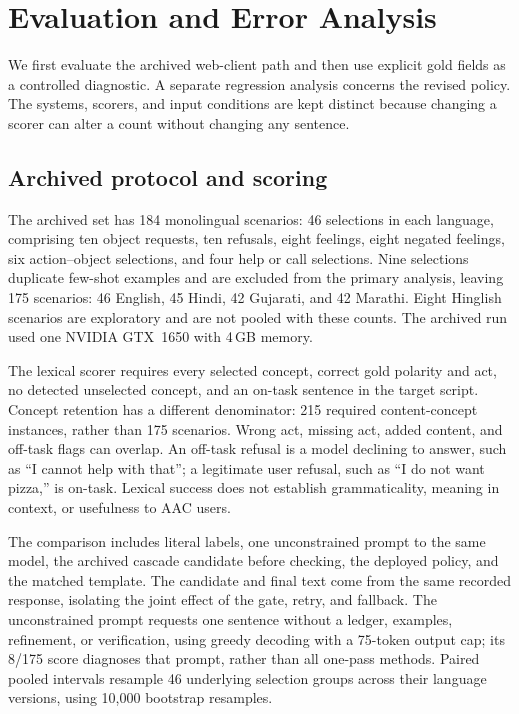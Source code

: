 \section{Evaluation and Error Analysis}
\label{sec:eval}
We first evaluate the archived web-client path and then use explicit gold fields as a controlled diagnostic.
A separate regression analysis concerns the revised policy.
The systems, scorers, and input conditions are kept distinct because changing a scorer can alter a count without changing any sentence.

\subsection{Archived protocol and scoring}
The archived set has 184 monolingual scenarios: 46 selections in each language, comprising ten object requests, ten refusals, eight feelings, eight negated feelings, six action--object selections, and four help or call selections.
Nine selections duplicate few-shot examples and are excluded from the primary analysis, leaving 175 scenarios: 46 English, 45 Hindi, 42 Gujarati, and 42 Marathi.
Eight Hinglish scenarios are exploratory and are not pooled with these counts.
The archived run used one NVIDIA GTX~1650 with 4\,GB memory.

The lexical scorer requires every selected concept, correct gold polarity and act, no detected unselected concept, and an on-task sentence in the target script.
Concept retention has a different denominator: 215 required content-concept instances, rather than 175 scenarios.
Wrong act, missing act, added content, and off-task flags can overlap.
An off-task refusal is a model declining to answer, such as “I cannot help with that”; a legitimate user refusal, such as “I do not want pizza,” is on-task.
Lexical success does not establish grammaticality, meaning in context, or usefulness to AAC users.

The comparison includes literal labels, one unconstrained prompt to the same model, the archived cascade candidate before checking, the deployed policy, and the matched template.
The candidate and final text come from the same recorded response, isolating the joint effect of the gate, retry, and fallback.
The unconstrained prompt requests one sentence without a ledger, examples, refinement, or verification, using greedy decoding with a 75-token output cap; its 8/175 score diagnoses that prompt, rather than all one-pass methods.
Paired pooled intervals resample 46 underlying selection groups across their language versions, using 10,000 bootstrap resamples.

